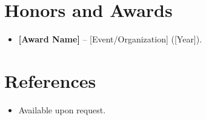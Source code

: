 \documentclass[11pt,a4paper,sans]{moderncv}
\begin{document}

\section{Honors and Awards}
\vspace{1pt}
\begin{itemize}
\item{\textbf{[Award Name]} -- [Event/Organization] ([Year]).}
\end{itemize}


\section{References}
\vspace{1pt}
\begin{itemize}
\item{Available upon request.}
\end{itemize}
\end{document}
